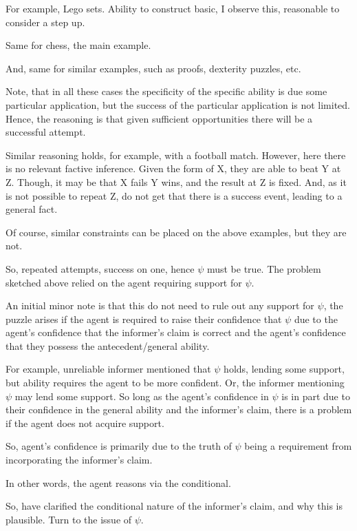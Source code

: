 \documentclass[10pt]{article}
\newcommand{\hozlinedash}[0]{%
  \noindent\hdashrule[0.5ex][c]{\textwidth}{.1pt}{2.5pt}
}
\begin{document}
For example, Lego sets.
Ability to construct basic, I observe this, reasonable to consider a step up.

Same for chess, the main example.

And, same for similar examples, such as proofs, dexterity puzzles, etc.

Note, that in all these cases the specificity of the specific ability is due some particular application, but the success of the particular application is not limited.
Hence, the reasoning is that given sufficient opportunities there will be a successful attempt.

Similar reasoning holds, for example, with a football match.
However, here there is no relevant factive inference.
Given the form of X, they are able to beat Y at Z.
Though, it may be that X fails Y wins, and the result at Z is fixed.
And, as it is not possible to repeat Z, do not get that there is a success event, leading to a general fact.

Of course, similar constraints can be placed on the above examples, but they are not.

So, repeated attempts, success on one, hence \(\psi\) must be true.
The problem sketched above relied on the agent requiring support for \(\psi\).

An initial minor note is that this do not need to rule out any support for \(\psi\), the puzzle arises if the agent is required to raise their confidence that \(\psi\) due to the agent's confidence that the informer's claim is correct and the agent's confidence that they possess the antecedent/general ability.

For example, unreliable informer mentioned that \(\psi\) holds, lending some support, but ability requires the agent to be more confident.
Or, the informer mentioning \(\psi\) may lend some support.
So long as the agent's confidence in \(\psi\) is in part due to their confidence in the general ability and the informer's claim, there is a problem if the agent does not acquire support.

So, agent's confidence is primarily due to the truth of \(\psi\) being a requirement from incorporating the informer's claim.

In other words, the agent reasons via the conditional.

\hozlinedash

So, have clarified the conditional nature of the informer's claim, and why this is plausible.
Turn to the issue of \(\psi\).
\end{document}
